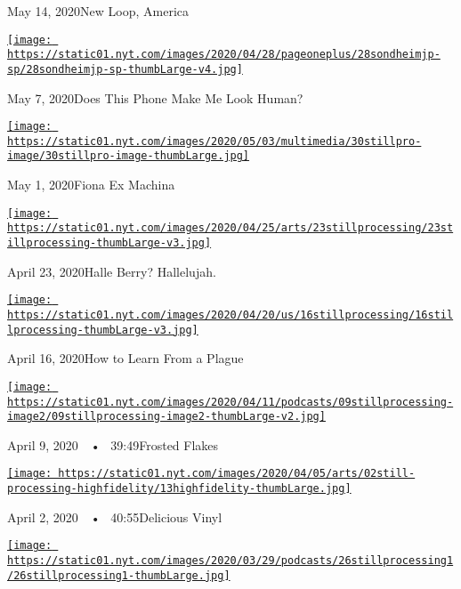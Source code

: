 May 14, 2020New Loop, America

\href{https://www.nytimes.com/2020/05/07/podcasts/still-processing-internet-vulnerability-sondheim-parks-recreation.html?action=click\&module=audio-series-bar\&region=header\&pgtype=Article}{\texttt{[image: https://static01.nyt.com/images/2020/04/28/pageoneplus/28sondheimjp-sp/28sondheimjp-sp-thumbLarge-v4.jpg]}}

May 7, 2020Does This Phone Make Me Look Human?

\href{https://www.nytimes.com/2020/04/30/podcasts/still-processing-fiona-apple-fetch-bolt-cutters.html?action=click\&module=audio-series-bar\&region=header\&pgtype=Article}{\texttt{[image: https://static01.nyt.com/images/2020/05/03/multimedia/30stillpro-image/30stillpro-image-thumbLarge.jpg]}}

May 1, 2020Fiona Ex Machina

\href{https://www.nytimes.com/2020/04/23/podcasts/still-processing-halle-berry-sharon-stone-catwoman-quarantine.html?action=click\&module=audio-series-bar\&region=header\&pgtype=Article}{\texttt{[image: https://static01.nyt.com/images/2020/04/25/arts/23stillprocessing/23stillprocessing-thumbLarge-v3.jpg]}}

April 23, 2020Halle Berry? Hallelujah.

\href{https://www.nytimes.com/2020/04/16/podcasts/still-processing-AIDS-survive-coronavirus.html?action=click\&module=audio-series-bar\&region=header\&pgtype=Article}{\texttt{[image: https://static01.nyt.com/images/2020/04/20/us/16stillprocessing/16stillprocessing-thumbLarge-v3.jpg]}}

April 16, 2020How to Learn From a Plague

\href{https://www.nytimes.com/2020/04/09/podcasts/still-processing-tiger-king.html?action=click\&module=audio-series-bar\&region=header\&pgtype=Article}{\texttt{[image: https://static01.nyt.com/images/2020/04/11/podcasts/09stillprocessing-image2/09stillprocessing-image2-thumbLarge-v2.jpg]}}

April 9, 2020~~•~ 39:49Frosted Flakes

\href{https://www.nytimes.com/2020/04/02/podcasts/high-fidelity-zoe-kravitz.html?action=click\&module=audio-series-bar\&region=header\&pgtype=Article}{\texttt{[image: https://static01.nyt.com/images/2020/04/05/arts/02still-processing-highfidelity/13highfidelity-thumbLarge.jpg]}}

April 2, 2020~~•~ 40:55Delicious Vinyl

\href{https://www.nytimes.com/2020/03/26/podcasts/still-processing-quarantine.html?action=click\&module=audio-series-bar\&region=header\&pgtype=Article}{\texttt{[image: https://static01.nyt.com/images/2020/03/29/podcasts/26stillprocessing1/26stillprocessing1-thumbLarge.jpg]}}

